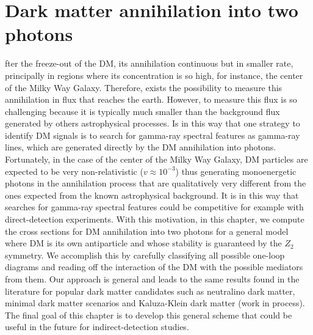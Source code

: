 \chapter{Dark matter annihilation into two photons}
%
fter the freeze-out of the DM, its annihilation continuous but in smaller rate, principally in regions where its concentration is so high, for instance, the center of the Milky Way Galaxy. 
Therefore, exists the possibility to measure this annihilation in flux that reaches the earth.
However, to measure this flux is so challenging because it is typically much smaller than the background flux generated by others astrophysical processes.
Is in this way that one strategy to identify DM signals is to search for gamma-ray spectral features as gamma-ray lines, which are generated directly by the DM annihilation into photons. Fortunately, in the case of the center of the Milky Way Galaxy, DM particles are expected to be very non-relativistic ($v\approx 10^{-3}$) thus generating monoenergetic photons in the annihilation process that are qualitatively very different from the ones expected from the known astrophysical background.
It is in this way that searches for gamma-ray spectral features could be competitive for example with direct-detection experiments.  
With this motivation, in this chapter, we compute the cross sections for DM annihilation into two photons for a general model where DM is its own antiparticle and whose stability is guaranteed by the $Z_2$ symmetry. We accomplish this  by carefully classifying all possible one-loop diagrams and reading off the interaction of the DM with the possible mediators from them. Our approach is general and leads to the same results found in the literature for popular dark matter candidates such as neutralino dark matter, minimal dark matter scenarios and Kaluza-Klein dark matter (work in process). The final goal of this chapter is to develop this general scheme that could be useful in the future for indirect-detection studies.










